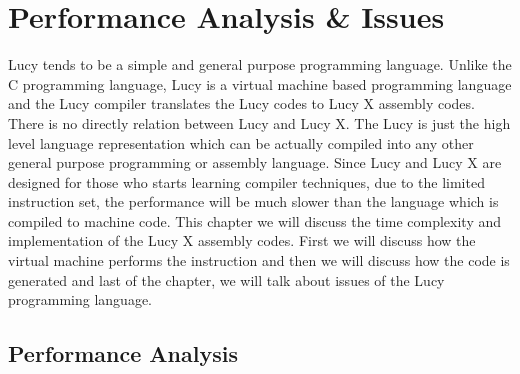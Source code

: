\chapter{Performance Analysis \& Issues}
Lucy tends to be a simple and general purpose programming language. Unlike the C programming language, Lucy is a virtual machine based programming language and the Lucy compiler translates the Lucy codes to Lucy X assembly codes. There is no directly relation between Lucy and Lucy X. The Lucy is just the high level language representation which can be actually compiled into any other general purpose programming or assembly language. Since Lucy and Lucy X are designed for those who starts learning compiler techniques, due to the limited instruction set, the performance will be much slower than the language which is compiled to machine code. This chapter we will discuss the time complexity and implementation of the Lucy X assembly codes. First we will discuss how the virtual machine performs the instruction and then we will discuss how the code is generated and last of the chapter, we will talk about issues of the Lucy programming language.


\section{Performance Analysis}
